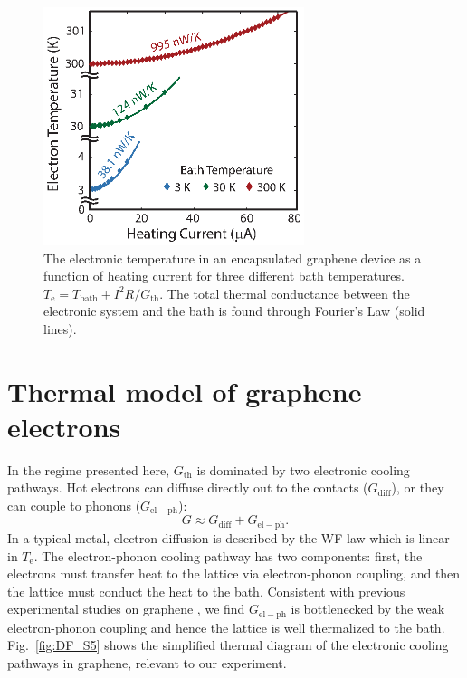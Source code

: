  \begin{figure}
\includegraphics[width=3in]{figures/Dirac_fluid/S4.eps}
\caption{The electronic temperature in an encapsulated graphene device as a function of heating current for three different bath temperatures.  $T_{\mathrm{e}}=T_{\mathrm{bath}}+I^2R/G_{\mathrm{th}}$.  The total thermal conductance between the electronic system and the bath is found through Fourier's Law (solid lines).}
\label{fig:DF_S4}
\end{figure}

\section{Thermal model of graphene electrons}\label{section:DF_s6sec}
In the regime presented here, $G_{\mathrm{th}}$ is dominated by two electronic cooling pathways.  Hot electrons can diffuse directly out to the contacts ($G_{\mathrm{diff}}$), or they can couple to phonons ($G_{\mathrm{el-ph}}$):  \begin{equation}
G \approx G_{\mathrm{diff}} + G_{\mathrm{el-ph}}.
\end{equation}
In a typical metal, electron diffusion is described by the WF law which is linear in $T_{\mathrm{e}}$.  The electron-phonon cooling pathway has two components:  first, the electrons must transfer heat to the lattice via electron-phonon coupling, and then the lattice must conduct the heat to the bath.   Consistent with previous experimental studies on graphene \cite{crossno_development_2015, fong_measurement_2013, yigen_wiedemannfranz_2014, laitinen_electron-phonon_2014}, we find $G_{\mathrm{el-ph}}$ is bottlenecked by the weak electron-phonon coupling and hence the lattice is well thermalized to the bath.  Fig.~\ref{fig:DF_S5} shows the simplified thermal diagram of the electronic cooling pathways in graphene, relevant to our experiment.



